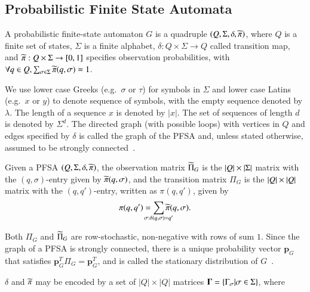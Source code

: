 \documentclass[9pt,journal]{IEEEtran}
\begin{document}
{ \subsection{Probabilistic Finite State Automata}
   \begin{defn}[PFSA]
     \label{defn:PFSA}
     A probabilistic finite-state automaton $G$ is a quadruple $\left( Q, \Sigma, \delta, \widetilde{\pi} \right)$, where $Q$ is a finite set of states, $\Sigma$ is a finite alphabet, $\delta:Q\times\Sigma \rightarrow Q$ called transition map, and $\widetilde{\pi}:Q \times \Sigma \rightarrow [0,1]$ specifies observation probabilities, with $\forall q \in Q, \sum_{\sigma \in \Sigma} \widetilde{\pi}(q,\sigma) = 1$.  
   \end{defn}
   We use lower case Greeks (e.g.~$\sigma$ or $\tau$) for symbols in $\Sigma$ and lower case Latins (e.g.~$x$ or $y$) to denote sequence of symbols, with the empty sequence denoted by $\lambda$. 
   The length of a sequence $x$ is denoted by $|x|$. 
   The set of sequences of length $d$ is denoted by $\Sigma^{d}$.
 The directed graph (with possible loops) with vertices in $Q$ and edges specified by $\delta$ is called the graph of the PFSA and, unless stated otherwise, assumed to be strongly connected~\cite{bondy2008graph}.
   \begin{defn}
     Given a PFSA $\left( Q, \Sigma, \delta, \widetilde{\pi} \right)$, the observation matrix $\widetilde{\Pi}_{G}$ is the $\left| Q \right|\times\left| \Sigma \right|$ matrix with the $(q,\sigma)$-entry given by $\widetilde{\pi}(q, \sigma)$, and the transition matrix $\Pi_{G}$ is the $\left| Q \right|\times\left| Q \right|$ matrix with the $(q, q')$-entry, written as $\pi(q, q')$, given by 
    \begin{gather}
       \pi(q, q') = \sum_{\mathclap{\sigma: \delta(q, \sigma)=q'}}\pitilde(q, \sigma).
   \end{gather}%
   \end{defn}%
   Both $\Pi_{G}$ and $\widetilde{\Pi}_{G}$ are row-stochastic, \ie non-negative with rows of sum $1$. 
   Since the graph of a PFSA is strongly connected, there is a unique probability vector $\mathbf{p}_{G}$ that satisfies $\mathbf{p}_{G}^{T}\Pi_{G} = \mathbf{p}_{G}^{T}$, and is called the stationary distribution of $G$~\cite{vidyasagar2014hidden}.  
   \begin{defn}
     \label{defn:GammaExpr}
    $\delta$ and $\widetilde{\pi}$ may be encoded by a set of $|Q| \times |Q|$ matrices $\mathbf{\Gamma} = \left\{ \Gamma_\sigma| \sigma\in\Sigma \right\}$, where
    \begin{gather}

\end{gather}
\end{defn}}
\end{document}
